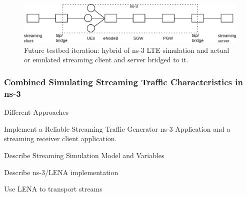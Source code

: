 \begin{figure}[htb]
\centering
\includegraphics[width=\textwidth]{images/streaming-hybrid.pdf}
\caption{Future testbed iteration: hybrid of ns-3 LTE simulation and actual or emulated streaming client and server bridged to it.}
\label{c5:fig:streaming-hybrid}
\end{figure}



\subsubsection{Combined Simulating Streaming Traffic Characteristics in ns-3}
\label{c5:mobilestreamingtestbed}

Different Approaches



Implement a Reliable Streaming Traffic Generator ns-3 Application and a streaming receiver client application.

Describe Streaming Simulation Model and Variables

Describe ns-3/LENA implementation

 Use LENA to transport streams



